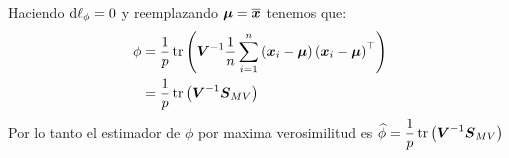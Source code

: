 Haciendo $\mathrm{d} \ell _\phi = 0$ y reemplazando $\boldsymbol{\mu} = \overline{\boldsymbol{x}}$ tenemos que:
\begin{align*}
\phi &= \dfrac{1}{p}\operatorname{tr}\left(  \boldsymbol{V}^{-1}\dfrac{1}{n}\sum_{i=1}^{n} \left( 
\boldsymbol{x}_i - \boldsymbol{\mu}
 \right)\left( 
\boldsymbol{x}_i - \boldsymbol{\mu}
 \right)^\top \right)\\
&= \dfrac{1}{p}\operatorname{tr}\left(  \boldsymbol{V}^{-1}\boldsymbol{S}_{MV} \right)
\end{align*}
Por lo tanto el estimador de $\phi$ por maxima verosimilitud es $\widehat{\phi} = \dfrac{1}{p} \operatorname{tr}\left( \boldsymbol{V}^{-1} \boldsymbol{S}_{MV} \right)$
